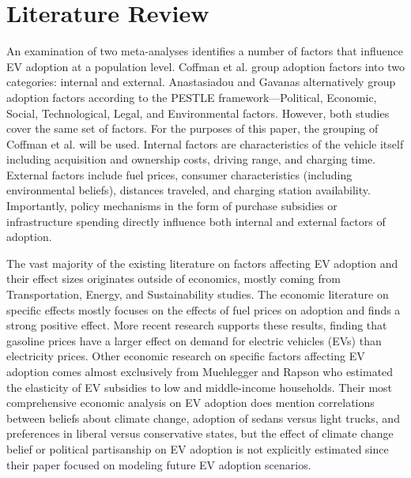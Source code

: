 \documentclass{article}
\begin{document}
\section{Literature Review}

An examination of two meta-analyses identifies a number of factors that influence EV adoption at a population level. Coffman et al. group adoption factors into two categories: internal and external. \autocite{coffman_bernstein_wee_2016} Anastasiadou and Gavanas alternatively group adoption factors according to the PESTLE framework—Political, Economic, Social, Technological, Legal, and Environmental factors. \autocite{anastasiadou_gavanas_2022} However, both studies cover the same set of factors. For the purposes of this paper, the grouping of Coffman et al. will be used. Internal factors are characteristics of the vehicle itself including acquisition and ownership costs, driving range, and charging time. External factors include fuel prices, consumer characteristics (including environmental beliefs), distances traveled, and charging station availability. Importantly, policy mechanisms in the form of purchase subsidies or infrastructure spending directly influence both internal and external factors of adoption.

The vast majority of the existing literature on factors affecting EV adoption and their effect sizes originates outside of economics, mostly coming from Transportation, Energy, and Sustainability studies. The economic literature on specific effects mostly focuses on the effects of fuel prices on adoption and finds a strong positive effect. \autocite{beresteanu_li_2011, gallagher_muehlegger_2011} More recent research supports these results, finding that gasoline prices have a larger effect on demand for electric vehicles (EVs) than electricity prices. \autocite{NBERw29842} Other economic research on specific factors affecting EV adoption comes almost exclusively from Muehlegger and Rapson who estimated the elasticity of EV subsidies to low and middle-income households. \autocite{NBERw25359} Their most comprehensive economic analysis on EV adoption does mention correlations between beliefs about climate change, adoption of sedans versus light trucks, and preferences in liberal versus conservative states, but the effect of climate change belief or political partisanship on EV adoption is not explicitly estimated since their paper focused on modeling future EV adoption scenarios. \autocite{NBERw28933}
\end{document}
